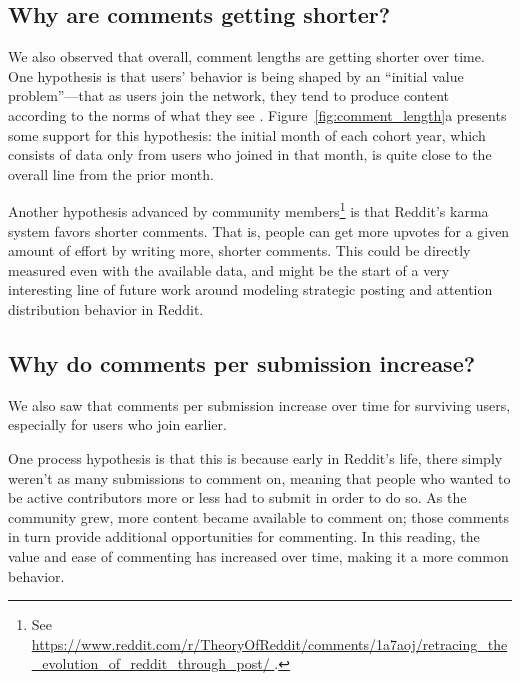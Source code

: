 
\subsection{Why are comments getting shorter?}

We also observed that overall, comment lengths are getting shorter over time.  
One hypothesis is that users' behavior is being shaped by an ``initial value problem''---that as users join the network, they tend to produce content according to the norms of what they see \cite{Kooti2010, Danescu-niculescu-mizil2013}.  
Figure~\ref{fig:comment_length}a presents some support for this hypothesis: the initial month of each cohort year, which consists of data only from users who joined in that month, is quite close to the overall line from the prior month.  

Another hypothesis advanced by community members\footnote{See \url{https://www.reddit.com/r/TheoryOfReddit/comments/1a7aoj/retracing_the_evolution_of_reddit_through_post/  }.} is that Reddit's karma system favors shorter comments.  That is, people can get more upvotes for a given amount of effort by writing more, shorter comments.  This could be directly measured even with the available data, and might be the start of a very interesting line of future work around modeling strategic posting and attention distribution behavior in Reddit. 

\subsection{Why do comments per submission increase?}

We also saw that comments per submission increase over time for surviving users, especially for users who join earlier.

One process hypothesis is that this is because early in Reddit's life, there simply weren't as many submissions to comment on, meaning that people who wanted to be active contributors more or less had to submit in order to do so. 
As the community grew, more content became available to comment on; those comments in turn provide additional opportunities for commenting.  In this reading, the value and ease of commenting has increased over time, making it a more common behavior. 


